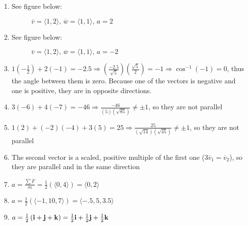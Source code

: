 \begin{enumerate}
\begin{itemize}
    \end{itemize}

    \setcounter{enumi}{8}

  \item See figure below:

    \begin{figure}[H]
      \centering 
      \caption{$\overline{v} = \langle 1, 2\rangle,\, \overline{w} = \langle 1, 1 \rangle,\, a = 2$}
    \end{figure}

  \item See figure below:

    \begin{figure}[H]
      \centering 
      \caption{$\overline{v} = \langle 1, 2\rangle,\, \overline{w} = \langle 1, 1 \rangle,\, a = -2$}
    \end{figure}

    \setcounter{enumi}{12}

  \item $1\left( -\frac{1}{2} \right) + 2(-1)=-2.5\Rightarrow \left(\frac{-2.5}{\sqrt{5}}\right)\left( \frac{\sqrt{5}}{2} \right)=-1\Rightarrow \cos^{-1}(-1)=0$, thus the angle between them is zero. Because one of the vectors is negative and one is positive, they are in opposite directions. 

  \item $3(-6)+4(-7)=-46\Rightarrow \frac{-46}{(5)(\sqrt{85})} \neq \pm 1$, so they are not parallel

  \item $1(2)+(-2)(-4)+3(5)=25\Rightarrow\frac{25}{(\sqrt{14})(\sqrt{45})}\neq \pm 1$, so they are not parallel

  \item The second vector is a scaled, positive multiple of the first one ($3\overline{v}_1=\overline{v}_2$), so they are parallel and in the same direction

    \setcounter{enumi}{18}

  \item $a = \frac{\sum \overline{F}}{m}=\frac{1}{2}\left( \langle 0, 4 \rangle \right) = \langle 0, 2 \rangle$

  \item $a = \frac{1}{2}\left( \langle -1, 10, 7 \rangle \right) = \langle -.5, 5, 3.5 \rangle$

  \item $a = \frac{1}{2}\left( \bold{i}+\bold{j}+\bold{k} \right) = \frac{1}{2}\bold{i}+\frac{1}{2}\bold{j}+\frac{1}{2}\bold{k}$


\end{enumerate}
